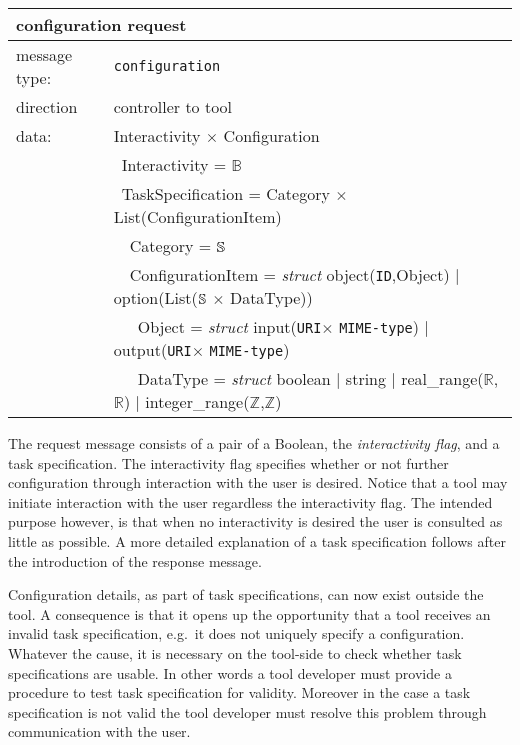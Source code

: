 \documentclass{article}
\newcommand{\msg}[1]{\texttt{#1}}
\newcommand{\String}{\ensuremath \mathbb{S}\xspace}
\newcommand{\Id}{\texttt{ID}\xspace}
\newcommand{\URI}{\texttt{URI}\xspace}
\newcommand{\MIMEtype}{\texttt{MIME-type}\xspace}
\begin{document}
   \begin{table}[H]
    \begin{center}
     \begin{tabular}{|ll|}
      \hline
       \multicolumn{2}{|l|}{\textbf{configuration request}} \\
      \hline
       message type:   & \msg{configuration} \\
      \hline
       direction       & controller to tool \\
      \hline
       data:           & Interactivity $\times$ Configuration \\
                       & \ Interactivity = $\mathbb{B}$ \\
                       & \ TaskSpecification = Category $\times$ List(ConfigurationItem) \\
                       & \ \ Category = $\String$ \\
                       & \ \ ConfigurationItem = \textit{struct} object(\Id,Object) $|$ option(List($\String$ $\times$ DataType)) \\
                       & \ \ \ Object = \textit{struct} input(\URI $\times$ \MIMEtype) $|$ output(\URI $\times$ \MIMEtype) \\
                       & \ \ \ DataType = \textit{struct} boolean $|$ string $|$ real\_range($\mathbb{R}$,$\mathbb{R}$) $|$ integer\_range($\mathbb{Z}$,$\mathbb{Z}$) \\
      \hline
     \end{tabular}
     \vspace{-0.3cm}
    \end{center}
   \end{table}

   \noindent The request message consists of a pair of a Boolean, the
   \textit{interactivity flag}, and a task specification. The interactivity
   flag specifies whether or not further configuration through interaction with
   the user is desired. Notice that a tool may initiate interaction with the
   user regardless the interactivity flag. The intended purpose however, is that
   when no interactivity is desired the user is consulted as little as
   possible. A more detailed explanation of a task specification follows after
   the introduction of the response message.

   Configuration details, as part of task specifications, can now exist outside
   the tool.  A consequence is that it opens up the opportunity that a tool
   receives an invalid task specification, e.g.\ it does not uniquely specify a
   configuration. Whatever the cause, it is necessary on the tool-side to check
   whether task specifications are usable.  In other words a tool developer
   must provide a procedure to test task specification for validity. Moreover
   in the case a task specification is not valid the tool developer must
   resolve this problem through communication with the user.
\end{document}
